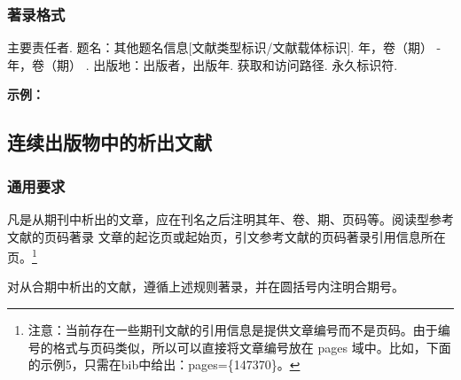 \documentclass[twoside]{article}%
\begin{document}
\subsubsection{著录格式}

主要责任者. 题名：其他题名信息[文献类型标识/文献载体标识]. 年，卷（期） -年，卷（期） .
出版地：出版者，出版年. 获取和访问路径. 永久标识符.



\begin{refsection}

\nocite{
中华医学会湖北分会1984----,
中国图书馆学会1957--1990--,
AAAS1883----,
Publiclibrary1979}


\textbf{示例：}

{\printbibliography[heading=none,env=indentegenv]}
\end{refsection}

\subsection{连续出版物中的析出文献}\label{sec:entrytype:article}

\subsubsection{通用要求}\label{sec:article:request}

凡是从期刊中析出的文章，应在刊名之后注明其年、卷、期、页码等。阅读型参考文献的页码著录
文章的起讫页或起始页，引文参考文献的页码著录引用信息所在页。\footnote{注意：当前存在一些期刊文献的引用信息是提供文章编号而不是页码。由于编号的格式与页码类似，所以可以直接将文章编号放在 pages 域中。比如，下面的示例5，只需在bib中给出：pages=\{147370\}。}

\begin{refsection}

\nocite{egdatevolnumpagea--,egdatevolnumpageb--,%
egdatevolnumpagec--,egdatevolnumpaged--,egdatevolnumpageg--,egdatevolnumpageh--}

{}
\end{refsection}

对从合期中析出的文献，遵循上述规则著录，并在圆括号内注明合期号。

\begin{refsection}
\nocite{egdatevolnumpagee--}

{}
\end{refsection}
\end{document}
